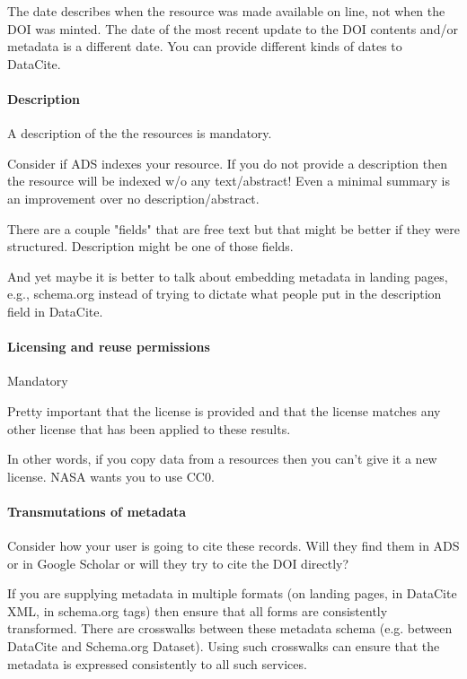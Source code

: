 \documentclass[11pt,a4paper]{ivoa}
\begin{document}
The date describes when the resource was made available on line, not when the DOI was minted. 
The date of the most recent update to the DOI contents and/or metadata is a different date. 
You can provide different kinds of dates to DataCite.



\paragraph{Description} 
A description of the the resources is mandatory. 

Consider if ADS indexes your resource. 
If you do not provide a description then the resource will be indexed w/o any text/abstract! 
Even a minimal summary is an improvement over no description/abstract.

There are a couple "fields" that are free text but that might be better if they were structured.
Description might be one of those fields.

And yet maybe it is better to talk about embedding metadata in landing pages, e.g., schema.org instead of trying to dictate what people put in the description field in DataCite.

\paragraph{Licensing and reuse permissions} 
Mandatory

Pretty important that the license is provided and that the license matches any other license that has been applied to these results. 

In other words, if you copy data from a resources then you can't give it a new license.
NASA wants you to use CC0.

\paragraph{Transmutations of metadata} 
Consider how your user is going to cite these records.
Will they find them in ADS or in Google Scholar or will they try to cite the DOI directly? 

If you are supplying metadata in multiple formats (on landing pages, in DataCite XML, in schema.org tags) then ensure that all forms are consistently transformed. 
There are crosswalks between these metadata schema (e.g. between DataCite and Schema.org Dataset). 
Using such crosswalks can ensure that the metadata is expressed consistently to all such services.
\end{document}
